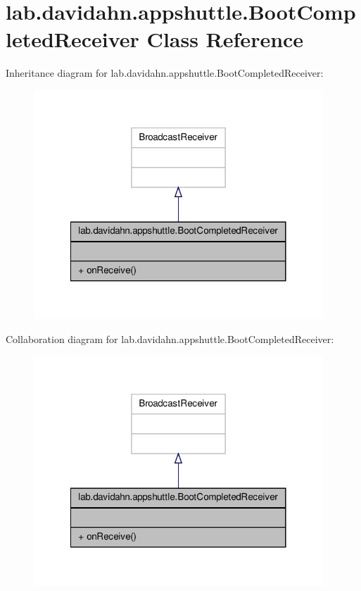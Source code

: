 \hypertarget{classlab_1_1davidahn_1_1appshuttle_1_1_boot_completed_receiver}{\section{lab.\-davidahn.\-appshuttle.\-Boot\-Completed\-Receiver \-Class \-Reference}
\label{classlab_1_1davidahn_1_1appshuttle_1_1_boot_completed_receiver}
}


\-Inheritance diagram for lab.\-davidahn.\-appshuttle.\-Boot\-Completed\-Receiver\-:
\nopagebreak
\begin{figure}[H]
\begin{center}
\leavevmode
\includegraphics[width=308pt]{classlab_1_1davidahn_1_1appshuttle_1_1_boot_completed_receiver__inherit__graph}
\end{center}
\end{figure}


\-Collaboration diagram for lab.\-davidahn.\-appshuttle.\-Boot\-Completed\-Receiver\-:
\nopagebreak
\begin{figure}[H]
\begin{center}
\leavevmode
\includegraphics[width=308pt]{classlab_1_1davidahn_1_1appshuttle_1_1_boot_completed_receiver__coll__graph}
\end{center}
\end{figure}
